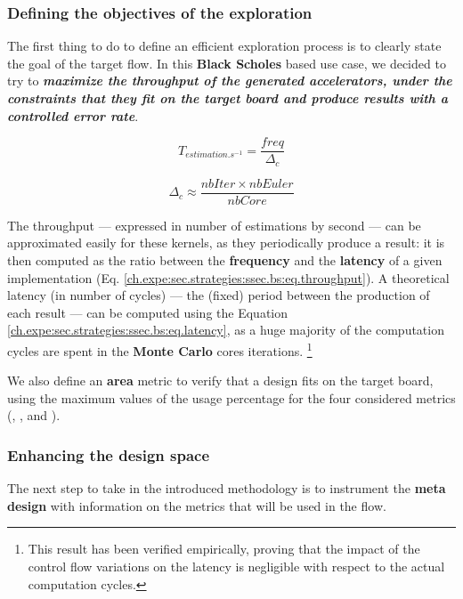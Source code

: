             \subsubsection{Defining the objectives of the exploration}
                The first thing to do to define an efficient exploration process is to clearly state the goal of the target flow.
                In this {\bf Black Scholes} based use case, we decided to try to \textbf{\emph{maximize the throughput of the generated accelerators, under the constraints that they fit on the target board and produce results with a controlled error rate}}.

                \begin{equation}
                    \label{ch.expe:sec.strategies:ssec.bs:eq.throughput}
                    T_{estimation.s^{-1}} = \frac{freq}{\Delta_c}
                \end{equation}

                \begin{equation}
                    \label{ch.expe:sec.strategies:ssec.bs:eq.latency}
                    \Delta_c \approx \frac{nbIter \times nbEuler}{nbCore}
                \end{equation}

                The throughput --- expressed in number of estimations by second --- can be approximated easily for these kernels, as they periodically produce a result: it is then computed as the ratio between the {\bf frequency} and the {\bf latency} of a given implementation (Eq. \ref{ch.expe:sec.strategies:ssec.bs:eq.throughput}).
                A theoretical latency (in number of cycles) --- \ie the (fixed) period between the production of each result --- can be computed using the Equation \ref{ch.expe:sec.strategies:ssec.bs:eq.latency}, as a huge majority of the computation cycles are spent in the {\bf Monte Carlo} cores iterations.%
                \footnote{This result has been verified empirically, proving that the impact of the control flow variations on the latency is negligible with respect to the actual computation cycles.}

                We also define an {\bf area} metric to verify that a design fits on the target board, using the maximum values of the usage percentage for the four considered metrics (, ,  and ). 

            \subsubsection{Enhancing the design space}
                The next step to take in the introduced methodology is to instrument the {\bf meta design} with information on the metrics that will be used in the flow.

